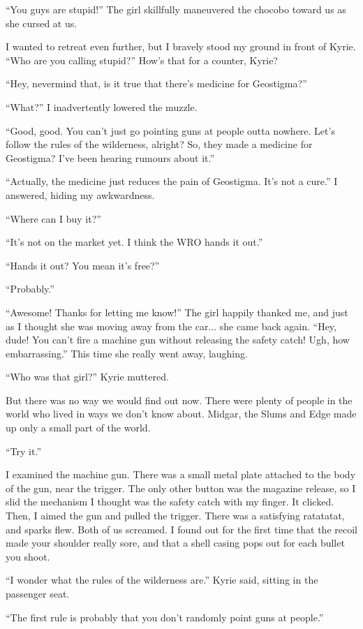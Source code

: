 \documentclass[oneside]{book}
\begin{document}
“You guys are stupid!” The girl skillfully maneuvered the chocobo toward us as she cursed at us.

I wanted to retreat even further, but I bravely stood my ground in front of Kyrie. “Who are you calling stupid?” How’s that for a counter, Kyrie?

“Hey, nevermind that, is it true that there’s medicine for Geostigma?”

“What?” I inadvertently lowered the muzzle.

“Good, good. You can’t just go pointing guns at people outta nowhere. Let’s follow the rules of the wilderness, alright? So, they made a medicine for Geostigma? I’ve been hearing rumours about it.”

“Actually, the medicine just reduces the pain of Geostigma. It’s not a cure.” I answered, hiding my awkwardness.

“Where can I buy it?”

“It’s not on the market yet. I think the WRO hands it out.”

“Hands it out? You mean it’s free?”

“Probably.”

“Awesome! Thanks for letting me know!” The girl happily thanked me, and just as I thought she was moving away from the car... she came back again. “Hey, dude! You can’t fire a machine gun without releasing the safety catch! Ugh, how embarrassing.” This time she really went away, laughing.

“Who was that girl?” Kyrie muttered.

But there was no way we would find out now. There were plenty of people in the world who lived in ways we don’t know about. Midgar, the Slums and Edge made up only a small part of the world.

“Try it.”

I examined the machine gun. There was a small metal plate attached to the body of the gun, near the trigger. The only other button was the magazine release, so I slid the mechanism I thought was the safety catch with my finger. It clicked. Then, I aimed the gun and pulled the trigger. There was a satisfying ratatatat, and sparks flew. Both of us screamed. I found out for the first time that the recoil made your shoulder really sore, and that a shell casing pops out for each bullet you shoot.

“I wonder what the rules of the wilderness are.” Kyrie said, sitting in the passenger seat.

“The first rule is probably that you don’t randomly point guns at people.”
\end{document}
